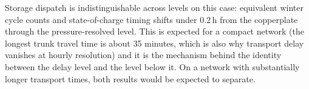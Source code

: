 Storage dispatch is indistinguishable across levels on this case: equivalent winter cycle
counts and state-of-charge timing shifts under $0.2$\,h from the copperplate through the
pressure-resolved level. This is expected for a compact network (the longest trunk travel
time is about 35 minutes, which is also why transport delay vanishes at hourly resolution)
and it is the mechanism behind the identity between the delay level and the level below
it. On a network with substantially longer transport times, both results would be expected
to separate.
